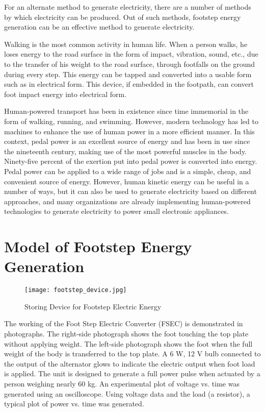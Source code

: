 \documentclass[12pt]{article}
\begin{document}
For an alternate method to generate electricity, there are a number of methods by which electricity can be produced. Out of such methods, footstep energy generation can be an effective method to generate electricity.

Walking is the most common activity in human life. When a person walks, he loses energy to the road surface in the form of impact, vibration, sound, etc., due to the transfer of his weight to the road surface, through footfalls on the ground during every step. This energy can be tapped and converted into a usable form such as in electrical form. This device, if embedded in the footpath, can convert foot impact energy into electrical form.

Human-powered transport has been in existence since time immemorial in the form of walking, running, and swimming. However, modern technology has led to machines to enhance the use of human power in a more efficient manner. In this context, pedal power is an excellent source of energy and has been in use since the nineteenth century, making use of the most powerful muscles in the body. Ninety-five percent of the exertion put into pedal power is converted into energy. Pedal power can be applied to a wide range of jobs and is a simple, cheap, and convenient source of energy. However, human kinetic energy can be useful in a number of ways, but it can also be used to generate electricity based on different approaches, and many organizations are already implementing human-powered technologies to generate electricity to power small electronic appliances.

 \newpage 



\section*{Model of Footstep Energy Generation}

\begin{figure}[h!]
    \centering
    \texttt{[image: footstep\_device.jpg]} %
    \caption{Storing Device for Footstep Electric Energy}
\end{figure}

The working of the Foot Step Electric Converter (FSEC) is demonstrated in photographs. The right-side photograph shows the foot touching the top plate without applying weight. The left-side photograph shows the foot when the full weight of the body is transferred to the top plate. A 6 W, 12 V bulb connected to the output of the alternator glows to indicate the electric output when foot load is applied. The unit is designed to generate a full power pulse when actuated by a person weighing nearly 60 kg. An experimental plot of voltage vs. time was generated using an oscilloscope. Using voltage data and the load (a resistor), a typical plot of power vs. time was generated.
\end{document}
